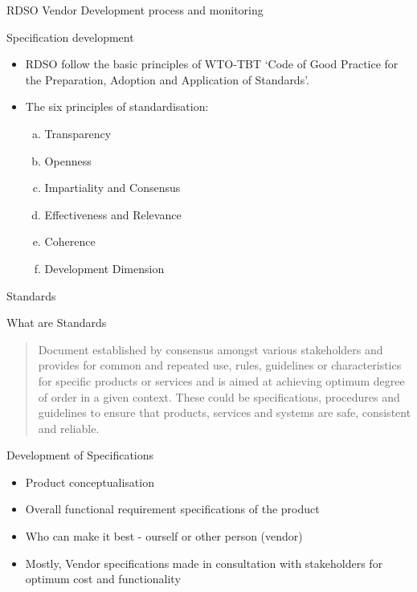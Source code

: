 \documentclass[
  10pt,
  ignorenonframetext,
  aspectratio=43,
]{beamer}
\providecommand{\tightlist}{%
  \setlength{\itemsep}{0pt}\setlength{\parskip}{0pt}}
\begin{document}
\begin{frame}{RDSO Vendor Development process and monitoring}
\protect\hypertarget{rdso-vendor-development-process-and-monitoring}{}
\begin{block}{Specification development}
\protect\hypertarget{specification-development}{}
\begin{itemize}
\item
  RDSO follow the basic principles of WTO-TBT `Code of Good Practice for
  the Preparation, Adoption and Application of Standards'.
\item
  The six principles of standardisation:

  \begin{enumerate}
  [a)]
  \tightlist
  \item
    Transparency
  \item
    Openness
  \item
    Impartiality and Consensus
  \item
    Effectiveness and Relevance
  \item
    Coherence
  \item
    Development Dimension
  \end{enumerate}
\end{itemize}
\end{block}
\end{frame}

\begin{frame}{Standards}
\protect\hypertarget{standards}{}
\begin{block}{What are Standards}
\protect\hypertarget{what-are-standards}{}
\begin{quote}
Document established by consensus amongst various stakeholders and
provides for common and repeated use, rules, guidelines or
characteristics for specific products or services and is aimed at
achieving optimum degree of order in a given context. These could be
specifications, procedures and guidelines to ensure that products,
services and systems are safe, consistent and reliable.
\end{quote}
\end{block}

\begin{block}{Development of Specifications}
\protect\hypertarget{development-of-specifications}{}
\begin{itemize}
\tightlist
\item
  Product conceptualisation\\
\item
  Overall functional requirement specifications of the product
\item
  Who can make it best - ourself or other person (vendor)
\item
  Mostly, Vendor specifications made in consultation with stakeholders
  for optimum cost and functionality
\end{itemize}
\end{block}
\end{frame}
\end{document}
